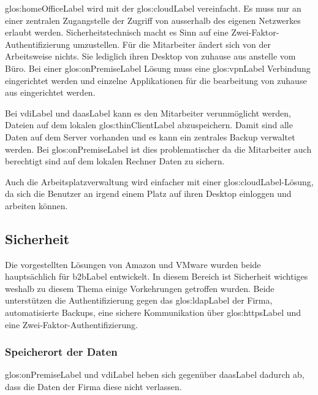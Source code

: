 \gls{glos:homeOfficeLabel} wird mit der \Gls{glos:cloudLabel} vereinfacht. Es muss nur an einer zentralen Zugangstelle der Zugriff von ausserhalb des eigenen Netzwerkes erlaubt werden. Sicherheitstechnisch macht es Sinn auf eine Zwei-Faktor-Authentifizierung umzustellen. Für die Mitarbeiter ändert sich von der Arbeitsweise nichts. Sie lediglich ihren Desktop von zuhause aus anstelle vom Büro. Bei einer \gls{glos:onPremiseLabel} Lösung muss eine \gls{glos:vpnLabel} Verbindung eingerichtet werden und einzelne Applikationen für die bearbeitung von zuhause aus eingerichtet werden.

Bei \Gls{vdiLabel} und \Gls{daasLabel} kann es den Mitarbeiter verunmöglicht werden, Dateien auf dem lokalen \gls{glos:thinClientLabel} abzuspeichern. Damit sind alle Daten auf dem Server vorhanden und es kann ein zentrales Backup verwaltet werden. Bei \gls{glos:onPremiseLabel} ist dies problematischer da die Mitarbeiter auch berechtigt sind auf dem lokalen Rechner Daten zu sichern.

Auch die Arbeitsplatzverwaltung wird einfacher mit einer \Gls{glos:cloudLabel}-Lösung, da sich die Benutzer an irgend einem Platz auf ihren Desktop einloggen und arbeiten können.

\subsection{Sicherheit}
Die vorgestellten Lösungen von Amazon und VMware wurden beide hauptsächlich für \Gls{b2bLabel} entwickelt. In diesem Bereich ist Sicherheit wichtiges weshalb zu diesem Thema einige Vorkehrungen getroffen wurden. Beide unterstützen die Authentifizierung gegen das \gls{glos:ldapLabel} der Firma, automatisierte Backups, eine sichere Kommunikation über \gls{glos:httpsLabel} und eine Zwei-Faktor-Authentifizierung.

\subsubsection{Speicherort der Daten}
\Gls{glos:onPremiseLabel} und \Gls{vdiLabel} heben sich gegenüber \Gls{daasLabel} dadurch ab, dass die Daten der Firma diese nicht verlassen.

